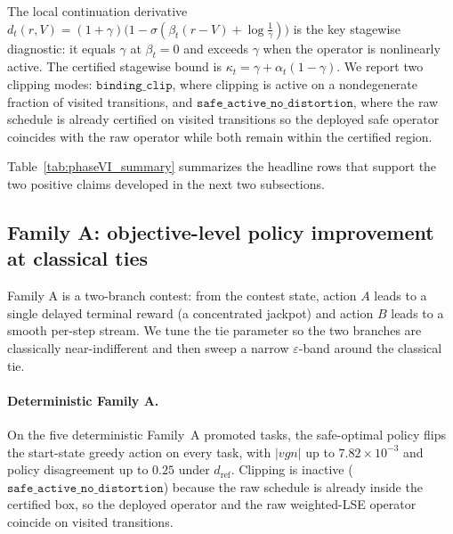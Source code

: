 \documentclass{article}
\theoremstyle{remark}
\begin{document}
The local continuation derivative
$d_t(r,V)=(1+\gamma)\bigl(1-\sigma(\beta_t(r-V)+\log\tfrac1\gamma)\bigr)$
is the key stagewise diagnostic: it equals $\gamma$ at $\beta_t=0$ and
exceeds $\gamma$ when the operator is nonlinearly active. The certified
stagewise bound is $\kappa_t=\gamma+\alpha_t(1-\gamma)$. We report two
clipping modes: $\texttt{binding\_clip}$, where clipping is active on a
nondegenerate fraction of visited transitions, and
$\texttt{safe\_active\_no\_distortion}$, where the raw schedule is
already certified on visited transitions so the deployed safe operator
coincides with the raw operator while both remain within the certified
region.

Table~\ref{tab:phaseVI_summary} summarizes the headline rows that
support the two positive claims developed in the next two subsections.


\subsection{Family A: objective-level policy improvement at classical ties}
\label{sec:exp-mechanism}

Family A is a two-branch contest: from the contest state, action $A$
leads to a single delayed terminal reward (a concentrated jackpot) and
action $B$ leads to a smooth per-step stream. We tune the tie parameter
so the two branches are classically near-indifferent and then sweep a
narrow $\varepsilon$-band around the classical tie.

\paragraph{Deterministic Family A.}
On the five deterministic Family~A promoted tasks, the safe-optimal
policy flips the start-state greedy action on every task, with
$|vgn|$ up to $7.82\times 10^{-3}$ and policy disagreement up to
$0.25$ under $d_\mathrm{ref}$. Clipping is inactive
($\texttt{safe\_active\_no\_distortion}$) because the raw schedule is
already inside the certified box, so the deployed operator and the
raw weighted-LSE operator coincide on visited transitions.
\end{document}
